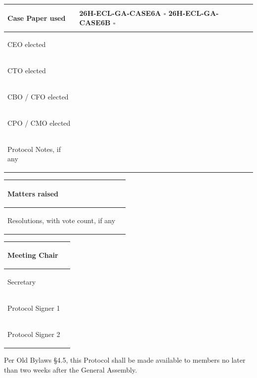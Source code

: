 \documentclass{../../../Common/Latex/Templates/rapport}
\begin{document}
\begin{tabularx}{\textwidth}{|>{\bfseries\raggedright\arraybackslash}p{5cm}|X|}
  \hline
  Case Paper used        & \rule{0pt}{0.9cm}26H-ECL-GA-CASE6A \quad $\square$ \quad\quad 26H-ECL-GA-CASE6B \quad $\square$ \\
  \hline
  CEO elected            & \rule{0pt}{0.9cm}                                                                               \\
  \hline
  CTO elected            & \rule{0pt}{0.9cm}                                                                               \\
  \hline
  CBO / CFO elected      & \rule{0pt}{0.9cm}                                                                               \\
  \hline
  CPO / CMO elected      & \rule{0pt}{0.9cm}                                                                               \\
  \hline
  Protocol Notes, if any & \rule{0pt}{1.2cm}                                                                               \\
  \hline
\end{tabularx}

\begin{tabularx}{\textwidth}{|>{\bfseries\raggedright\arraybackslash}p{5cm}|X|}
  \hline
  Matters raised                       & \rule{0pt}{1.8cm} \\
  \hline
  Resolutions, with vote count, if any & \rule{0pt}{1.8cm} \\
  \hline
\end{tabularx}

\rule{0pt}{3cm}

\begin{tabularx}{\textwidth}{|>{\bfseries\raggedright\arraybackslash}p{5cm}|X|}
  \hline
  Meeting Chair     & \rule{0pt}{1.4cm} \\
  \hline
  Secretary         & \rule{0pt}{1.4cm} \\
  \hline
  Protocol Signer 1 & \rule{0pt}{1.4cm} \\
  \hline
  Protocol Signer 2 & \rule{0pt}{1.4cm} \\
  \hline
\end{tabularx}

\vspace{0.4cm}
Per Old Bylaws \S4.5, this Protocol shall be made available to members no later than two weeks after the General Assembly.
\end{document}
